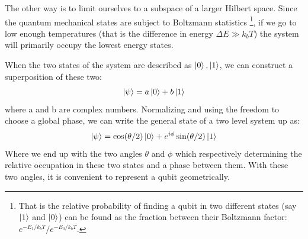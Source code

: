 The other way is to limit ourselves to a subspace of a larger Hilbert space. Since the quantum mechanical states are subject to Boltzmann statistics \footnote{That is the relative probability of finding a qubit in two different states (say $\ket{1}$ and $\ket{0}$) can be found as the fraction between their Boltzmann factor: $e^{-E_1 / k_b  T} / e^{- E_0 / k_b  T}$.}, if we go to low enough temperatures (that is the difference in energy $\Delta E \gg k_b T$)  the system will primarily occupy the lowest energy states. 

When the two states of the system are described as $\ket{0}, \ket{1}$, we can construct a superposition of these two:
\begin{equation}
    \ket{\psi} = a \ket{0} + b \ket{1}
\end{equation}
where a and b are complex numbers. Normalizing and using the freedom to choose a global phase, we can write the general state of a two level system up as:
\begin{equation}\label{eq:general_2_state}
    \ket{\psi} = \cos (\theta / 2) \ket{0} + e^{i\phi}\sin(\theta / 2)\ket{1}
\end{equation}
Where we end up with the two angles $\theta$ and $\phi$ which respectively determining the relative occupation in these two states and a phase between them. With these two angles, it is convenient to represent a qubit geometrically.

